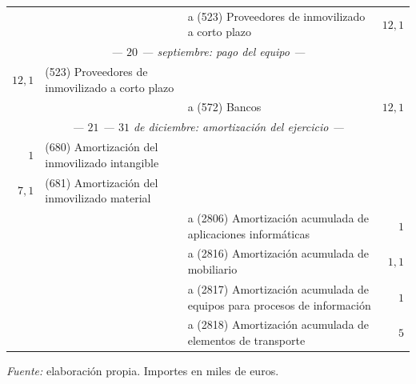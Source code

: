 \documentclass[10pt,a4paper]{article}
\begin{document}
\begin{center}
\begin{minipage}{\linewidth}
{\begin{tabular}{r p{5.6cm} p{6.4cm} r}
 & & \raggedright a (523) Proveedores de inmovilizado a corto plazo & $12,1$ \\
\multicolumn{4}{c}{\textit{--- $20$ --- septiembre: pago del equipo ---}} \\
$12,1$ & \raggedright (523) Proveedores de inmovilizado a corto plazo & & \\
 & & \raggedright a (572) Bancos & $12,1$ \\
\multicolumn{4}{c}{\textit{--- $21$ --- $31$ de diciembre: amortización del ejercicio ---}} \\
$1$ & \raggedright (680) Amortización del inmovilizado intangible & & \\
$7,1$ & \raggedright (681) Amortización del inmovilizado material & & \\
 & & \raggedright a (2806) Amortización acumulada de aplicaciones informáticas & $1$ \\
 & & \raggedright a (2816) Amortización acumulada de mobiliario & $1,1$ \\
 & & \raggedright a (2817) Amortización acumulada de equipos para procesos de información & $1$ \\
 & & \raggedright a (2818) Amortización acumulada de elementos de transporte & $5$ \\
\hline
\end{tabular}}\par\vspace{0.3em}
{\small\textit{Fuente: }elaboración propia. Importes en miles de euros.}
\end{minipage}\end{center}
\end{document}
